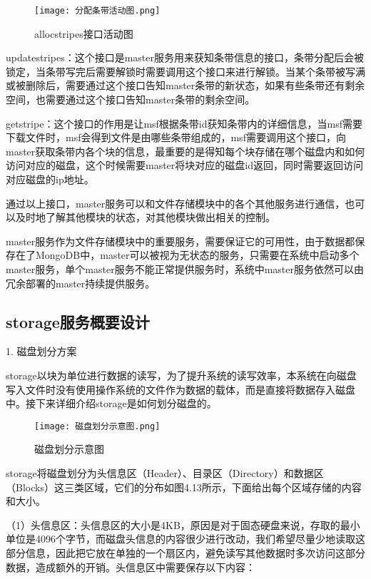 \begin{figure}
  \centering
  \texttt{[image: 分配条带活动图.png]}
  \caption{allocstripes接口活动图}
\end{figure}

updatestripes：这个接口是master服务用来获知条带信息的接口，条带分配后会被锁定，当条带写完后需要解锁时需要调用这个接口来进行解锁。当某个条带被写满或被删除后，需要通过这个接口告知master条带的新状态，如果有些条带还有剩余空间，也需要通过这个接口告知master条带的剩余空间。

getstripe：这个接口的作用是让msf根据条带id获知条带内的详细信息，当msf需要下载文件时，msf会得到文件是由哪些条带组成的，msf需要调用这个接口，向master获取条带内各个块的信息，最重要的是得知每个块存储在哪个磁盘内和如何访问对应的磁盘，这个时候需要master将块对应的磁盘id返回，同时需要返回访问对应磁盘的ip地址。

通过以上接口，master服务可以和文件存储模块中的各个其他服务进行通信，也可以及时地了解其他模块的状态，对其他模块做出相关的控制。

master服务作为文件存储模块中的重要服务，需要保证它的可用性，由于数据都保存在了MongoDB中，master可以被视为无状态的服务，只需要在系统中启动多个master服务，单个master服务不能正常提供服务时，系统中master服务依然可以由冗余部署的master持续提供服务。

\subsection{storage服务概要设计}

1. 磁盘划分方案

storage以块为单位进行数据的读写，为了提升系统的读写效率，本系统在向磁盘写入文件时没有使用操作系统的文件作为数据的载体，而是直接将数据存入磁盘中。接下来详细介绍storage是如何划分磁盘的。

\begin{figure}
  \centering
  \texttt{[image: 磁盘划分示意图.png]}
  \caption{磁盘划分示意图}
\end{figure}

storage将磁盘划分为头信息区（Header）、目录区（Directory）和数据区（Blocks）这三类区域，它们的分布如图4.13所示，下面给出每个区域存储的内容和大小。

（1）头信息区：头信息区的大小是4KB，原因是对于固态硬盘来说，存取的最小单位是4096个字节，而磁盘头信息的内容很少进行改动，我们希望尽量少地读取这部分信息，因此把它放在单独的一个扇区内，避免读写其他数据时多次访问这部分数据，造成额外的开销。头信息区中需要保存以下内容：

